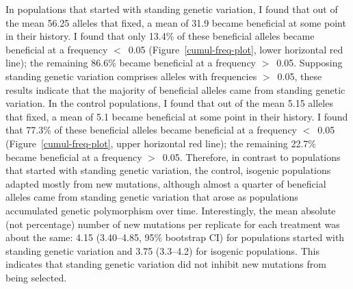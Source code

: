 \begin{doublespace}
In populations that started with standing genetic variation,
I found that out of the mean 56.25 alleles that fixed,
a mean of 31.9 became beneficial at some point in their history.
%
I found that only 13.4\% of these beneficial alleles
became beneficial at a frequency $<$~0.05
(Figure~\ref{cumul-freq-plot}, lower horizontal red line);
the remaining 86.6\% became beneficial at a frequency $>$~0.05.
%
Supposing standing genetic variation comprises
alleles with frequencies $>$~0.05,
these results indicate that the majority of beneficial alleles
came from standing genetic variation.
%
In the control populations,
I found that out of the mean 5.15 alleles that fixed,
a mean of 5.1 became beneficial at some point in their history.
%
I found that 77.3\% of these beneficial alleles
became beneficial at a frequency $<$~0.05
(Figure~\ref{cumul-freq-plot}, upper horizontal red line);
the remaining 22.7\% became beneficial at a frequency $>$~0.05.
%
Therefore,
in contrast to populations that started with standing genetic variation,
the control, isogenic populations adapted mostly from new mutations,
although almost a quarter of beneficial alleles
came from standing genetic variation that arose
as populations accumulated genetic polymorphism over time.
%
Interestingly, the mean absolute (not percentage) number of new mutations
per replicate for each treatment was about the same:
4.15 (3.40--4.85, 95\% bootstrap CI) for populations started with
standing genetic variation and 3.75 (3.3--4.2) for isogenic populations.
%
This indicates that standing genetic variation did not
inhibit new mutations from being selected.






\end{doublespace}
